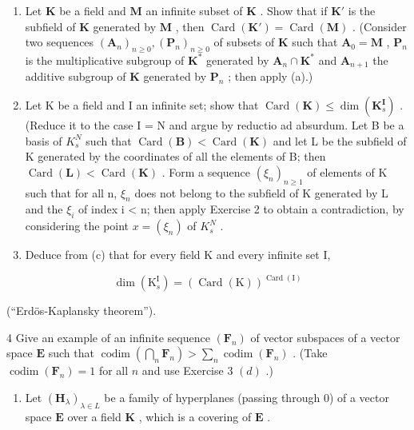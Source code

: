 \begin{enumerate}
\def\labelenumi{(\alph{enumi})}
\setcounter{enumi}{1}
\item
  Let \(\mathbf{K}\) be a field and \(\mathbf{M}\) an infinite subset of \(\mathbf{K}\) . Show that if \(\mathbf{K}'\) is the subfield of \(\mathbf{K}\) generated by \(\mathbf{M}\) , then \(\operatorname{Card}(\mathbf{K}') = \operatorname{Card}(\mathbf{M})\) . (Consider two sequences \((\mathbf{A}_n)_{n \geqslant 0}, (\mathbf{P}_n)_{n \geqslant 0}\) of subsets of \(\mathbf{K}\) such that \(\mathbf{A}_0 = \mathbf{M}\) , \(\mathbf{P}_n\) is the multiplicative subgroup of \(\mathbf{K}^*\) generated by \(\mathbf{A}_n \cap \mathbf{K}^*\) and \(\mathbf{A}_{n+1}\) the additive subgroup of \(\mathbf{K}\) generated by \(\mathbf{P}_n\) ; then apply (a).)
\item
  Let K be a field and I an infinite set; show that \(\operatorname{Card}(\mathbf{K}) \leqslant \dim(\mathbf{K}_{s}^{\mathbf{I}})\) . (Reduce it to the case I = N and argue by reductio ad absurdum. Let B be a basis of \(K_{s}^{N}\) such that \(\operatorname{Card}(\mathbf{B}) < \operatorname{Card}(\mathbf{K})\) and let L be the subfield of K generated by the coordinates of all the elements of B; then \(\operatorname{Card}(\mathbf{L}) < \operatorname{Card}(\mathbf{K})\) . Form a sequence \((\xi_{n})_{n \geqslant 1}\) of elements of K such that for all n, \(\xi_{n}\) does not belong to the subfield of K generated by L and the \(\xi_{i}\) of index i \textless{} n; then apply Exercise 2 to obtain a contradiction, by considering the point \(x = (\xi_{n})\) of \(K_{s}^{N}\) .
\item
  Deduce from (c) that for every field K and every infinite set I,
\end{enumerate}

\[
\dim (\mathrm{K} _ {s} ^ {\mathrm{I}}) = (\operatorname{Card} (\mathrm{K})) ^ {\operatorname{Card} (\mathrm{I})}
\]

(``Erdös-Kaplansky theorem'').

4 Give an example of an infinite sequence \((\mathbf{F}_n)\) of vector subspaces of a vector space \(\mathbf{E}\) such that \(\operatorname{codim}\left(\bigcap_{n} \mathbf{F}_n\right) > \sum_{n} \operatorname{codim}(\mathbf{F}_n)\) . (Take \(\operatorname{codim}(\mathbf{F}_n) = 1\) for all \(n\) and use Exercise 3 \((d)\) .)

\begin{enumerate}
\def\labelenumi{\arabic{enumi}.}
\setcounter{enumi}{4}
\tightlist
\item
  Let \((\mathbf{H}_{\lambda})_{\lambda \in L}\) be a family of hyperplanes (passing through 0) of a vector space \(\mathbf{E}\) over a field \(\mathbf{K}\) , which is a covering of \(\mathbf{E}\) .
\end{enumerate}

